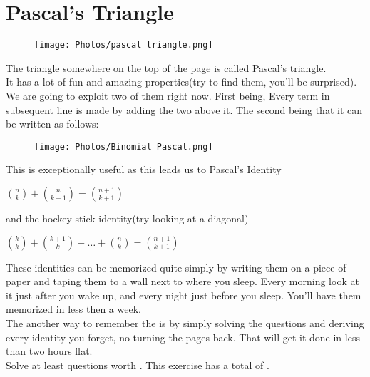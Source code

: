 \section{Pascal's Triangle}
\begin{figure}[H]
\texttt{[image: Photos/pascal triangle.png]}
\end{figure}
The triangle somewhere on the top of the page is called Pascal's triangle. \\
It has a lot of fun and amazing properties(try to find them, you'll be surprised).\\
We are going to exploit two of them right now. First being, Every term in subsequent line is made by adding the two above it. The second being that it can be written as follows:
\begin{figure}[H]
\texttt{[image: Photos/Binomial Pascal.png]}
\end{figure}
This is exceptionally useful as this leads us to Pascal's Identity
\begin{theorem}
    $\binom{n}{k} + \binom{n}{k+1}=\binom{n+1}{k+1}$
\end{theorem}
and the hockey stick identity(try looking at a diagonal)
\begin{theorem}
    $\binom{k}{k}+\binom{k+1}{k}+ \dots +\binom{n}{k}=\binom{n+1}{k+1}$
\end{theorem}
These identities can be memorized quite simply by writing them on a piece of paper and taping them to a wall next to where you sleep. Every morning look at it just after you wake up, and every night just before you sleep. You'll have them memorized in less then a week.\\
The another way to remember the is by simply solving the questions and deriving every identity you forget, no turning the pages back. That will get it done in less than  two hours flat.\\
Solve at least questions worth . This exercise has a total of .
